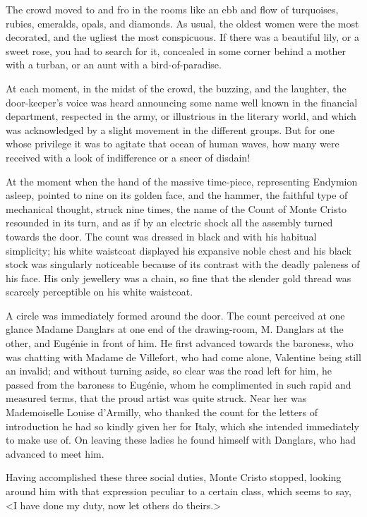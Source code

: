  The crowd moved to and fro in the rooms like an ebb and flow of turquoises, rubies, emeralds, opals, and diamonds. As usual, the oldest women were the most decorated, and the ugliest the most conspicuous. If there was a beautiful lily, or a sweet rose, you had to search for it, concealed in some corner behind a mother with a turban, or an aunt with a bird-of-paradise. 

 At each moment, in the midst of the crowd, the buzzing, and the laughter, the door-keeper's voice was heard announcing some name well known in the financial department, respected in the army, or illustrious in the literary world, and which was acknowledged by a slight movement in the different groups. But for one whose privilege it was to agitate that ocean of human waves, how many were received with a look of indifference or a sneer of disdain! 

 At the moment when the hand of the massive time-piece, representing Endymion asleep, pointed to nine on its golden face, and the hammer, the faithful type of mechanical thought, struck nine times, the name of the Count of Monte Cristo resounded in its turn, and as if by an electric shock all the assembly turned towards the door. The count was dressed in black and with his habitual simplicity; his white waistcoat displayed his expansive noble chest and his black stock was singularly noticeable because of its contrast with the deadly paleness of his face. His only jewellery was a chain, so fine that the slender gold thread was scarcely perceptible on his white waistcoat. 

 A circle was immediately formed around the door. The count perceived at one glance Madame Danglars at one end of the drawing-room, M. Danglars at the other, and Eugénie in front of him. He first advanced towards the baroness, who was chatting with Madame de Villefort, who had come alone, Valentine being still an invalid; and without turning aside, so clear was the road left for him, he passed from the baroness to Eugénie, whom he complimented in such rapid and measured terms, that the proud artist was quite struck. Near her was Mademoiselle Louise d'Armilly, who thanked the count for the letters of introduction he had so kindly given her for Italy, which she intended immediately to make use of. On leaving these ladies he found himself with Danglars, who had advanced to meet him. 

 Having accomplished these three social duties, Monte Cristo stopped, looking around him with that expression peculiar to a certain class, which seems to say, <I have done my duty, now let others do theirs.> 

